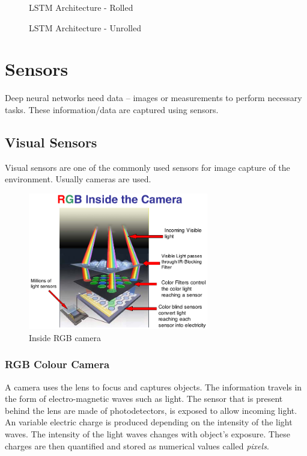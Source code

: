 \begin{figure}[h]
    \centering
	   \def\svgwidth{0.8\textwidth}
    \caption{LSTM Architecture - Rolled}
    \label{fig:lstm}
\end{figure}

\begin{figure}[h]
        \def\svgwidth{1.09\textwidth}
    \caption{LSTM Architecture - Unrolled}
    \label{fig:lstmunrolled}
\end{figure}
\section{Sensors}
Deep neural networks need data -- images or measurements to perform necessary tasks. These
information/data are captured using sensors.
\subsection{Visual Sensors}
Visual sensors are one of the commonly used sensors for image capture of the environment.
Usually cameras are used.
\begin{figure}[h]
	\centering
    \includegraphics[width=0.7\textwidth, scale=0.1]{figures/inkscape/rgbcamerasensor1.png}
    \caption{Inside RGB camera}
    \label{fig:rgbcamera}
\end{figure}

\subsubsection*{RGB Colour Camera}
A camera uses the lens to focus and captures objects. The information travels in the form of electro-magnetic waves such as light. The sensor
that is present behind the lens are made of photodetectors, is exposed to allow incoming
light. An variable electric charge is produced depending on the intensity of the light
waves. The intensity of the light waves changes with object's exposure. These charges are then quantified and stored as numerical values called
\textit{pixels}.

